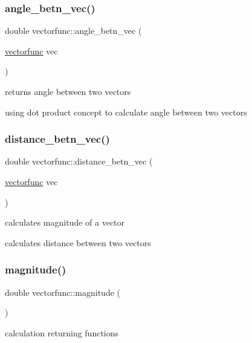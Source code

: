 \subsubsection{\texorpdfstring{angle\+\_\+betn\+\_\+vec()}{angle\_betn\_vec()}}
{\footnotesize\ttfamily double vectorfunc\+::angle\+\_\+betn\+\_\+vec (\begin{DoxyParamCaption}\item[{\mbox{\hyperlink{classvectorfunc}{vectorfunc}}}]{vec }\end{DoxyParamCaption})}



returns angle between two vectors 

using dot product concept to calculate angle between two vectors \mbox{\label{classvectorfunc_a0d773a2e884277629e55d5e3deb94106}} 
\subsubsection{\texorpdfstring{distance\+\_\+betn\+\_\+vec()}{distance\_betn\_vec()}}
{\footnotesize\ttfamily double vectorfunc\+::distance\+\_\+betn\+\_\+vec (\begin{DoxyParamCaption}\item[{\mbox{\hyperlink{classvectorfunc}{vectorfunc}}}]{vec }\end{DoxyParamCaption})}



calculates magnitude of a vector 

calculates distance between two vectors \mbox{\label{classvectorfunc_ad57efcec7f489fdfff980fc12706d9c6}} 
\subsubsection{\texorpdfstring{magnitude()}{magnitude()}}
{\footnotesize\ttfamily double vectorfunc\+::magnitude (\begin{DoxyParamCaption}{ }\end{DoxyParamCaption})}



calculation returning functions 

